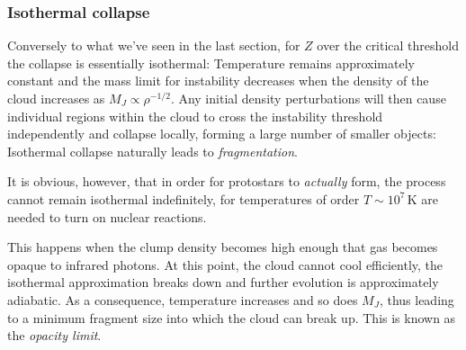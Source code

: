 \subsubsection*{Isothermal collapse}
Conversely to what we've seen in the last section, for $Z$ over the critical threshold the collapse is essentially isothermal: Temperature remains approximately constant and the mass limit for instability decreases when the density of the cloud increases as $M_{J}\propto \rho^{-1/2}$. Any initial density perturbations will then cause individual regions within the cloud to cross the instability threshold independently and collapse locally, forming a large number of smaller objects: Isothermal
collapse naturally leads to \emph{fragmentation}.
\par It is obvious, however, that in order for protostars to \emph{actually} form, the process cannot remain isothermal indefinitely, for temperatures of order $T\sim 10^{7}\,\text{K}$ are needed to turn on nuclear reactions.
\par This happens when the clump density becomes high enough that gas becomes opaque to infrared photons. At this point, the cloud cannot cool eﬃciently, the isothermal approximation breaks down and further evolution is approximately adiabatic. As a consequence, temperature increases
and so does $M_{J}$, thus leading to a minimum fragment size into which the cloud can break up. This is known as the \emph{opacity limit}.
